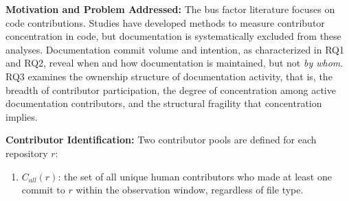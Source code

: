 \documentclass[10pt,conference]{IEEEtran}
\newcommand{\EAdejumo}[1]{\textcolor{red}{{\bfseries [[#1]]}}}
\begin{document}
{%

{\textbf{ Motivation and Problem Addressed:}} The bus factor literature focuses on code contributions. Studies \cite{cosentino2015assessing,jabrayilzade2022bus} have developed methods to measure contributor concentration in code, but documentation is systematically excluded from these analyses. Documentation commit volume and intention, as characterized in RQ1 and RQ2, reveal when and how documentation is maintained, but not \textit{by whom}. RQ3 examines the ownership structure of documentation activity, that is, the breadth
of contributor participation, the degree of concentration among active documentation contributors, and the structural fragility that
concentration implies.

\textbf{Contributor Identification: }
Two contributor pools are defined for each repository $r$:

\begin{enumerate}[label=\roman*.]
  \item $C_{\mathit{all}}(r)$: the set of all unique human contributors who made at least one commit to $r$ within the observation window, regardless of file type.


\end{enumerate}}
\end{document}
